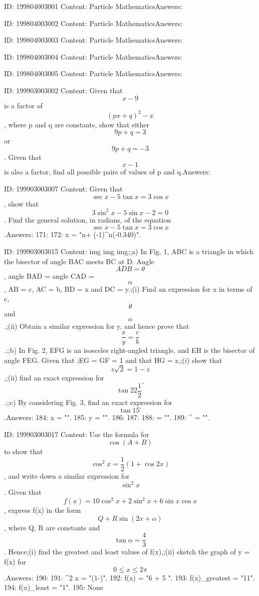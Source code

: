 \documentclass{article}
\begin{document}
ID: 199804003001
Content:
Particle MathematicsAnswers:

ID: 199804003002
Content:
Particle MathematicsAnswers:

ID: 199804003003
Content:
Particle MathematicsAnswers:

ID: 199804003004
Content:
Particle MathematicsAnswers:

ID: 199804003005
Content:
Particle MathematicsAnswers:

ID: 199903003002
Content:
Given that \[x - 9\] is a factor of \[(px + q)^2 - x\], where p and q are constants, show that either \[9p + q = 3\] or \[9p + q = -3\]. Given that \[x - 1\] is also a factor, find all possible pairs of values of p and q.Answers:

ID: 199903003007
Content:
Given that \[\sec x - 5\tan x = 3\cos x\], show that \[3\sin^2x - 5\sin x - 2 = 0\]. Find the general solution, in radians, of the equation \[\sec x - 5\tan x = 3\cos x\].Answers:
171: 
172: x = "n\pi + (-1)^n(-0.340)".

ID: 199903003015
Content:
img img img;;a) In Fig. 1, ABC is a triangle in which the bisector of angle BAC meets BC at D. Angle \[ADB = \theta\], angle BAD = angle CAD = \[\alpha\], AB = c, AC = b, BD = x and DC = y.;(i) Find an expression for x in terms of c, \[\theta\] and \[\alpha\].;(ii) Obtain a similar expression for y, and hence prove that \[\frac {x} {y} = \frac {c} {b}\].;;b) In Fig. 2, EFG is an isosceles right-angled triangle, and EH is the bisector of angle FEG. Given that ;EG = GF = 1 and that HG = z,;(i) show that \[z\sqrt{2} = 1 - z\],;(ii) find an exact expression for \[\tan 22\frac {1}{2}^{\circ}\].;;c) By considering Fig. 3, find an exact expression for \[\tan 15^{\circ}\].Answers:
184: x = "".
185: y = "".
186: 
187: 
188:  = "".
189: ^{\circ} = "".

ID: 199903003017
Content:
Use the formula for \[\cos (A+B)\] to show that \[\cos^2 x = \frac{1}{2} (1 + \cos 2x)\], and write down a similar expression for \[\sin^2 x\]. Given that \[f(x) = 10\cos^2 x + 2\sin^2 x + 6\sin x \cos x\], express f(x) in the form \[Q + R\sin(2x + \alpha)\], where Q, R are constants and \[\tan \alpha = \frac {4}{3}\]. Hence;(i) find the greatest and least values of f(x),;(ii) sketch the graph of y = f(x) for \[0 \leq x \leq 2\pi\].Answers:
190: 
191: \sin^{2} x  = "(1-)".
192: f(x) = "6 + 5 ".
193: f(x)_{greatest} = "11".
194: f(x)_{least} = "1".
195: None
\end{document}
